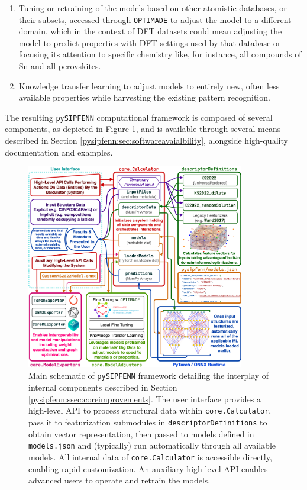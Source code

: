 \begin{enumerate}
\begin{enumerate}
        \item Tuning or retraining of the models based on other atomistic databases, or their subsets, accessed through \texttt{OPTIMADE} \cite{Andersen2021OPTIMADEData, Evans2024DevelopmentsExchange} to adjust the model to a different domain, which in the context of DFT datasets could mean adjusting the model to predict properties with DFT settings used by that database or focusing its attention to specific chemistry like, for instance, all compounds of Sn and all perovskites.
        
        \item Knowledge transfer learning \cite{Torrey2010HandbookLearning} to adjust models to entirely new, often less available properties while harvesting the existing pattern recognition.
    \end{enumerate}    
\end{enumerate}

The resulting \texttt{pySIPFENN} computational framework is composed of several components, as depicted in Figure \ref{pysipfenn:fig:pySIPFENNMainSchematic}, and is available through several means described in Section \ref{pysipfenn:sec:softwareavaialbility}, alongside high-quality documentation and examples.

\begin{figure}[h!]
    \centering
    \includegraphics[width=0.85\textwidth]{pysipfenn/pySIPFENN_MainSchematic.png}
    \caption{Main schematic of \texttt{pySIPFENN} framework detailing the interplay of internal components described in Section \ref{pysipfenn:ssec:coreimprovements}. The user interface provides a high-level API to process structural data within \texttt{core.Calculator}, pass it to featurization submodules in \texttt{descriptorDefinitions} to obtain vector representation, then passed to models defined in \texttt{models.json} and (typically) run automatically through all available models. All internal data of \texttt{core.Calculator} is accessible directly, enabling rapid customization. An auxiliary high-level API enables advanced users to operate and retrain the models.}
    \label{pysipfenn:fig:pySIPFENNMainSchematic}
\end{figure}


